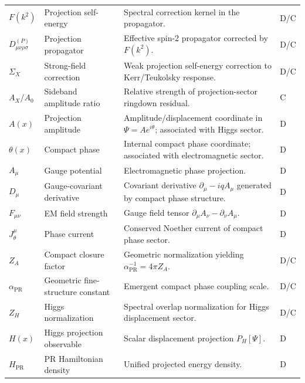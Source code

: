\documentclass[11pt]{article}
\newcommand{\PR}{\mathrm{PR}}
\begin{document}
\begin{longtable}{>{\raggedright\arraybackslash}p{}
>{\raggedright\arraybackslash}p{}
>{\raggedright\arraybackslash}p{}
>{\centering\arraybackslash}p{}}
$F(k^2)$ & Projection self-energy & Spectral correction kernel in the propagator. & D/C \\

$D_{\mu\nu\rho\sigma}^{(P)}$ & Projection propagator & Effective spin-2 propagator corrected by $F(k^2)$. & D/C \\

$\Sigma_X$ & Strong-field correction & Weak projection self-energy correction to Kerr/Teukolsky response. & D/C \\

$A_X/A_0$ & Sideband amplitude ratio & Relative strength of projection-sector ringdown residual. & C \\

$A(x)$ & Projection amplitude & Amplitude/displacement coordinate in $\Psi=Ae^{i\theta}$; associated with Higgs sector. & D \\

$\theta(x)$ & Compact phase & Internal compact phase coordinate; associated with electromagnetic sector. & D \\

$A_\mu$ & Gauge potential & Electromagnetic phase projection. & D \\

$D_\mu$ & Gauge-covariant derivative & Covariant derivative $\partial_\mu-iqA_\mu$ generated by compact phase structure. & D \\

$F_{\mu\nu}$ & EM field strength & Gauge field tensor $\partial_\mu A_\nu-\partial_\nu A_\mu$. & D \\

$J_\theta^\mu$ & Phase current & Conserved Noether current of compact phase sector. & D \\

$Z_A$ & Compact closure factor & Geometric normalization yielding $\alpha_{\PR}^{-1}=4\pi Z_A$. & D/C \\

$\alpha_{\PR}$ & Geometric fine-structure constant & Emergent compact phase coupling scale. & D/C \\

$Z_H$ & Higgs normalization & Spectral overlap normalization for Higgs displacement sector. & D/C \\

$H(x)$ & Higgs projection observable & Scalar displacement projection $P_H[\Psi]$. & D \\

$H_{\PR}$ & PR Hamiltonian density & Unified projected energy density. & D \\


\end{longtable}
\end{document}
